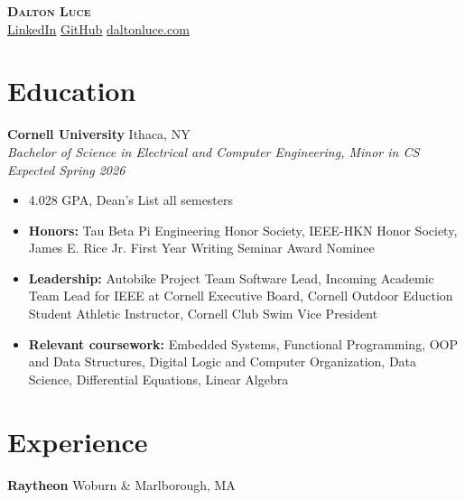 \documentclass[letterpaper,10pt]{article}
\newcommand{\company}[2]{
    \vspace{6pt}
    {\large \textbf{#1}}
    \hfill
    {\normalsize {#2}}
    \\
}
\newcommand{\resumeEntry}[4]{
    \vspace{4pt}
    {\large \textbf{#1}}
    \hfill
    {\normalsize #2}
    \\
    \textit{#3} \hfill \textit{#4}
    \vspace{1pt}
}
\newcommand{\itemsBegin}{
    \begin{itemize}[leftmargin=0.2in, labelsep=0.05in, itemsep=0pt, parsep=1pt, topsep=0pt, partopsep=0pt]
}
\newcommand{\itemsEnd}{\end{itemize}}
\begin{document}
\textbf{\huge \scshape Dalton Luce} \\
\vspace{2pt}
\small
\addressConditional{}   %
\phoneConditional{}     %
\emailConditional{}     %
\href{https://www.linkedin.com/in/dalton-luce/}{\underline{LinkedIn}} %
\hspace{10pt}
\href{https://github.com/da-luce}{\underline{GitHub}}                 %
\hspace{10pt}
\href{https://daltonluce.com/}{\underline{daltonluce.com}}            %
\vspace{-5pt}

\section{Education}

    \resumeEntry{Cornell University}
        {Ithaca, NY}
        {Bachelor of Science in Electrical and Computer Engineering, Minor in CS}
        {Expected Spring 2026}

    \itemsBegin{}
        \item 4.028 GPA, Dean's List all semesters
        \item \textbf{Honors:} Tau Beta Pi Engineering Honor Society, IEEE-HKN Honor Society, James E. Rice Jr. First Year Writing Seminar Award Nominee
        \item \textbf{Leadership:} Autobike Project Team Software Lead, Incoming Academic Team Lead for IEEE at Cornell Executive Board, Cornell Outdoor Eduction Student Athletic Instructor, Cornell Club Swim Vice President
        \item \textbf{Relevant coursework:} Embedded Systems, Functional Programming, OOP and Data Structures, Digital Logic and Computer Organization, Data Science, Differential Equations, Linear Algebra
    \itemsEnd{}

\section{Experience}

    \company{Raytheon}{Woburn \& Marlborough, MA}
\end{document}
